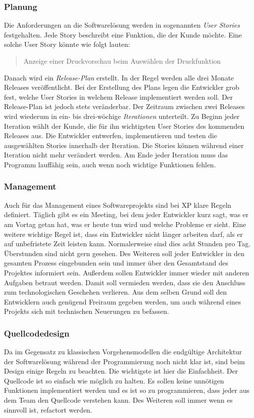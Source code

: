 \subsubsection{Planung}
Die Anforderungen an die Softwarelösung werden in sogenannten \emph{User Stories} festgehalten. Jede Story beschreibt eine Funktion, die der Kunde möchte. Eine solche User Story könnte wie folgt lauten:
\begin{quote}
Anzeige einer Druckvorschau beim Auswählen der Druckfunktion
\end{quote}
Danach wird ein \emph{Release-Plan} erstellt. In der Regel werden alle drei Monate Releases veröffentlicht. Bei der Erstellung des Plans legen die Entwickler grob fest, welche User Stories in welchem Release implementiert werden soll. Der Release-Plan ist jedoch stets veränderbar. Der Zeitraum zwischen zwei Releases wird wiederum in ein- bis drei-wöchige \emph{Iterationen} unterteilt. Zu Beginn jeder Iteration wählt der Kunde, die für ihn wichtigsten User Stories des kommenden Releases aus. Die Entwickler entwerfen, implementieren und testen die ausgewählten Stories innerhalb der Iteration. Die Stories können während einer Iteration nicht mehr verändert werden. Am Ende jeder Iteration muss das Programm lauffähig sein, auch wenn noch wichtige Funktionen fehlen.

\subsubsection{Management}
Auch für das Management eines Softwareprojekts sind bei XP klare Regeln definiert. Täglich gibt es ein Meeting, bei dem jeder Entwickler kurz sagt, was er am Vortag getan hat, was er heute tun wird und welche Probleme er sieht. Eine weitere wichtige Regel ist, dass ein Entwickler nicht länger arbeiten darf, als er auf unbefristete Zeit leisten kann. Normalerweise sind dies acht Stunden pro Tag. Überstunden sind nicht gern gesehen. Des Weiteren soll jeder Entwickler in den gesamten Prozess eingebunden sein und immer über den Gesamtstand des Projektes informiert sein. Außerdem sollen Entwickler immer wieder mit anderen Aufgaben betraut werden. Damit soll vermieden werden, dass sie den Anschluss zum technologischen Geschehen verlieren. Aus dem selben Grund soll den Entwicklern auch genügend Freiraum gegeben werden, um auch während eines Projekts sich mit technischen Neuerungen zu befassen.

\subsubsection{Quellcodedesign}
Da im Gegensatz zu klassischen Vorgehensmodellen die end\-gül\-ti\-ge Architektur der Softwarelösung während der Programmierung noch nicht klar ist, sind beim Design einige Regeln zu beachten. Die wichtigste ist hier die Einfachheit. Der Quellcode ist so einfach wie möglich zu halten. Es sollen keine unnötigen Funktionen implementiert werden und es ist so zu programmieren, dass jeder aus dem Team den Quellcode verstehen kann. Des Weiteren soll immer wenn es sinnvoll ist, refactort werden.

